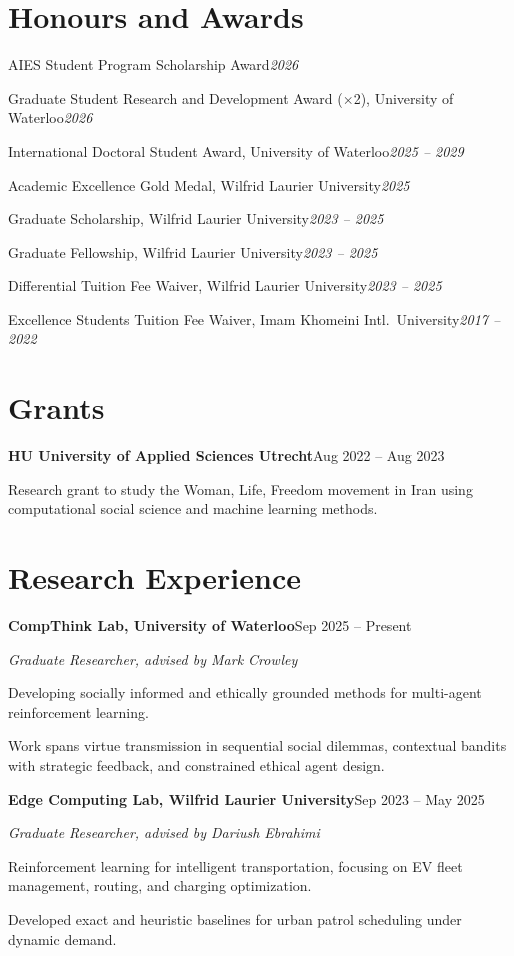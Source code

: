 \documentclass[letterpaper,11pt]{article}
\newcommand{\role}[2]{\textbf{#1}\hfill{#2}\par}
\newcommand{\sub}[2]{#1\hfill\textit{#2}\par}
\newcommand{\gap}{\vspace{0.7em}}
\begin{document}
\section{Honours and Awards}

\sub{AIES Student Program Scholarship Award}{2026}
\sub{Graduate Student Research and Development Award ($\times$2), University of Waterloo}{2026}
\sub{International Doctoral Student Award, University of Waterloo}{2025 -- 2029}
\sub{Academic Excellence Gold Medal, Wilfrid Laurier University}{2025}
\sub{Graduate Scholarship, Wilfrid Laurier University}{2023 -- 2025}
\sub{Graduate Fellowship, Wilfrid Laurier University}{2023 -- 2025}
\sub{Differential Tuition Fee Waiver, Wilfrid Laurier University}{2023 -- 2025}
\sub{Excellence Students Tuition Fee Waiver, Imam Khomeini Intl.\ University}{2017 -- 2022}

\section{Grants}

\role{HU University of Applied Sciences Utrecht}{Aug 2022 -- Aug 2023}
Research grant to study the Woman, Life, Freedom movement in Iran using computational social
science and machine learning methods.

\section{Research Experience}

\role{CompThink Lab, University of Waterloo}{Sep 2025 -- Present}
\textit{Graduate Researcher, advised by Mark Crowley}
\begin{tight}
  \item Developing socially informed and ethically grounded methods for multi-agent reinforcement learning.
  \item Work spans virtue transmission in sequential social dilemmas, contextual bandits with strategic feedback, and constrained ethical agent design.
\end{tight}
\gap

\role{Edge Computing Lab, Wilfrid Laurier University}{Sep 2023 -- May 2025}
\textit{Graduate Researcher, advised by Dariush Ebrahimi}
\begin{tight}
  \item Reinforcement learning for intelligent transportation, focusing on EV fleet management, routing, and charging optimization.
  \item Developed exact and heuristic baselines for urban patrol scheduling under dynamic demand.
\end{tight}
\gap
\end{document}
